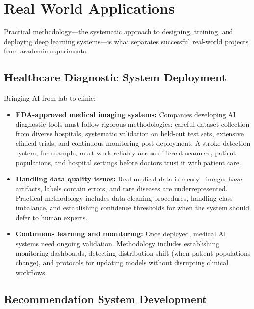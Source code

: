 
\section{Real World Applications}
\label{sec:methodology-real-world}


Practical methodology—the systematic approach to designing, training, and deploying deep learning systems—is what separates successful real-world projects from academic experiments.

\subsection{Healthcare Diagnostic System Deployment}

Bringing AI from lab to clinic:

\begin{itemize}
    \item \textbf{FDA-approved medical imaging systems:} Companies developing AI diagnostic tools must follow rigorous methodologies: careful dataset collection from diverse hospitals, systematic validation on held-out test sets, extensive clinical trials, and continuous monitoring post-deployment. A stroke detection system, for example, must work reliably across different scanners, patient populations, and hospital settings before doctors trust it with patient care.
    
    \item \textbf{Handling data quality issues:} Real medical data is messy—images have artifacts, labels contain errors, and rare diseases are underrepresented. Practical methodology includes data cleaning procedures, handling class imbalance, and establishing confidence thresholds for when the system should defer to human experts.
    
    \item \textbf{Continuous learning and monitoring:} Once deployed, medical AI systems need ongoing validation. Methodology includes establishing monitoring dashboards, detecting distribution shift (when patient populations change), and protocols for updating models without disrupting clinical workflows.
\end{itemize}

\subsection{Recommendation System Development}

